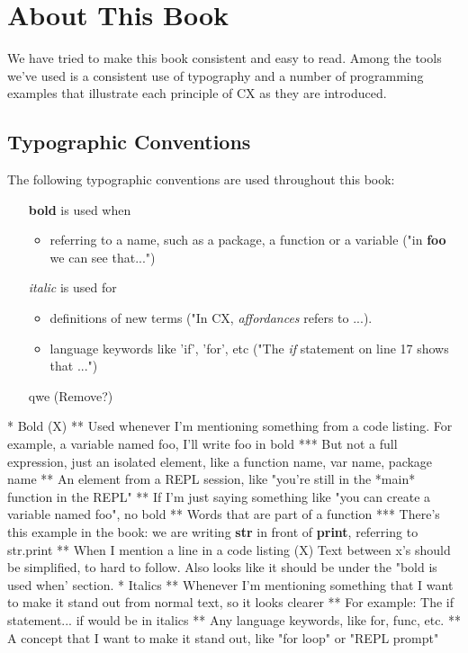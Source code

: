 \documentclass[11pt,fleqn,openany]{book} %
\begin{document}
\section{About This Book}
\label{chapter:about-this-book}

We have tried to make this book consistent and easy to read. Among the tools we've used is a consistent use of typography and a number of programming examples that illustrate each principle of CX as they are introduced.

\subsection{Typographic Conventions}

The following typographic conventions are used throughout this book:
\begin{itemize}
    \item[\textbf{bold}] is used when 
    \begin{itemize}
        \item referring to a name, such as a package, a function or a variable ("in \textbf{foo} we can see that...")
    \end{itemize}
    \item[\textit{italic}] is used for
    \begin{itemize}
        \item definitions of new terms ("In CX, \textit{affordances} refers to ...).
        \item language keywords like 'if', 'for', etc ("The \textit{if} statement on line 17 shows that ...")
    \end{itemize}
    \item[qwe](Remove?)
\end{itemize}
* Bold (X)
** Used whenever I'm mentioning something from a code listing. For example, a variable named foo, I'll write foo in bold
*** But not a full expression, just an isolated element, like a function name, var name, package name
** An element from a REPL session, like "you're still in the *main* function in the REPL"
** If I'm just saying something like "you can create a variable named foo", no bold
** Words that are part of a function
*** There's this example in the book:  we are writing \textbf{str} in front of \textbf{print}, referring to str.print
** When I mention a line in a code listing
(X) Text between x's should be simplified, to hard to follow. Also looks like it should be under the "bold is used when' section. 
* Italics
** Whenever I'm mentioning something that I want to make it stand out from normal text, so it looks clearer
** For example: The if statement... if would be in italics
** Any language keywords, like for, func, etc.
** A concept that I want to make it stand out, like "for loop" or "REPL prompt"
\end{document}
